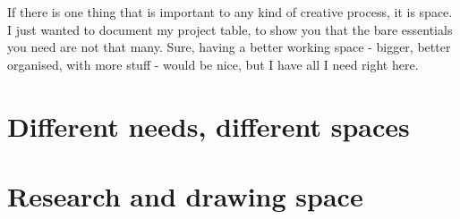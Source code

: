 If there is one thing that is important to any kind of creative process, it is space. I just wanted to document my project table, to show you that the bare essentials you need are not that many. Sure, having a better working space - bigger, better organised, with more stuff - would be nice, but I have all I need right here.

\section{Different needs, different spaces}


\section{Research and drawing space}


